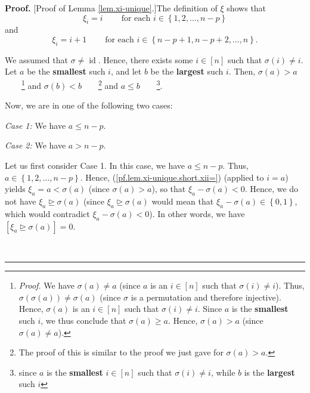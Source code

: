 \documentclass[numbers=enddot,12pt,final,onecolumn,notitlepage,english]{scrartcl}%
\theoremstyle{definition}
\newenvironment{proof}[1][Proof]{\noindent\textbf{#1.} }{\ \rule{0.5em}{0.5em}}
\newenvironment{vershort}{}{}
\begin{document}
\begin{vershort}
\begin{proof}
[Proof of Lemma \ref{lem.xi-unique}.]The definition of $\xi$ shows that%
\begin{equation}
\xi_{i}=i\ \ \ \ \ \ \ \ \ \ \text{for each }i\in\left\{  1,2,\ldots
,n-p\right\}  \label{pf.lem.xi-unique.short.xii=}%
\end{equation}
and%
\begin{equation}
\xi_{i}=i+1\ \ \ \ \ \ \ \ \ \ \text{for each }i\in\left\{  n-p+1,n-p+2,\ldots
,n\right\}  . \label{pf.lem.xi-unique.short.xin=}%
\end{equation}


We assumed that $\sigma\neq\operatorname*{id}$. Hence, there exists some
$i\in\left[  n\right]  $ such that $\sigma\left(  i\right)  \neq i$. Let $a$
be the \textbf{smallest} such $i$, and let $b$ be the \textbf{largest} such
$i$. Then, $\sigma\left(  a\right)  >a$\ \ \ \ \footnote{\textit{Proof.} We
have $\sigma\left(  a\right)  \neq a$ (since $a$ is an $i\in\left[  n\right]
$ such that $\sigma\left(  i\right)  \neq i$). Thus, $\sigma\left(
\sigma\left(  a\right)  \right)  \neq\sigma\left(  a\right)  $ (since $\sigma$
is a permutation and therefore injective). Hence, $\sigma\left(  a\right)  $
is an $i\in\left[  n\right]  $ such that $\sigma\left(  i\right)  \neq i$.
Since $a$ is the \textbf{smallest} such $i$, we thus conclude that
$\sigma\left(  a\right)  \geq a$. Hence, $\sigma\left(  a\right)  >a$ (since
$\sigma\left(  a\right)  \neq a$).} and $\sigma\left(  b\right)
<b$\ \ \ \ \footnote{The proof of this is similar to the proof we just gave
for $\sigma\left(  a\right)  >a$.} and $a\leq b$\ \ \ \ \footnote{since $a$ is
the \textbf{smallest} $i\in\left[  n\right]  $ such that $\sigma\left(
i\right)  \neq i$, while $b$ is the \textbf{largest} such $i$}.

Now, we are in one of the following two cases:

\textit{Case 1:} We have $a\leq n-p$.

\textit{Case 2:} We have $a>n-p$.

Let us first consider Case 1. In this case, we have $a\leq n-p$. Thus,
$a\in\left\{  1,2,\ldots,n-p\right\}  $. Hence,
(\ref{pf.lem.xi-unique.short.xii=}) (applied to $i=a$) yields $\xi
_{a}=a<\sigma\left(  a\right)  $ (since $\sigma\left(  a\right)  >a$), so that
$\xi_{a}-\sigma\left(  a\right)  <0$. Hence, we do not have $\xi
_{a}\trianglerighteq\sigma\left(  a\right)  $ (since $\xi_{a}\trianglerighteq
\sigma\left(  a\right)  $ would mean that $\xi_{a}-\sigma\left(  a\right)
\in\left\{  0,1\right\}  $, which would contradict $\xi_{a}-\sigma\left(
a\right)  <0$). In other words, we have $\left[  \xi_{a}\trianglerighteq
\sigma\left(  a\right)  \right]  =0$.


\end{proof}
\end{vershort}
\end{document}
